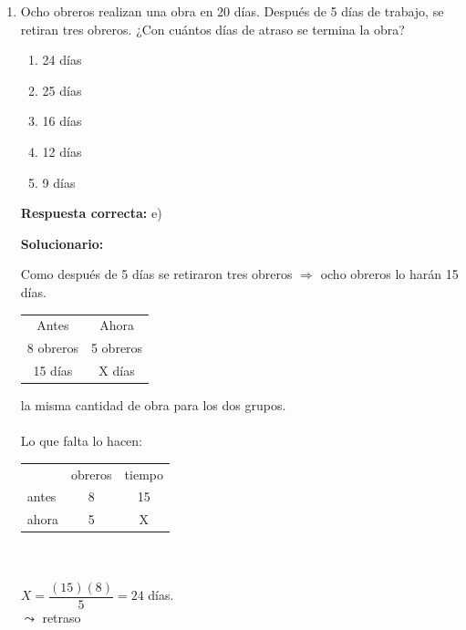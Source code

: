 \begin{enumerate}
	\vspace{2mm}
	\textbf{Solucionario:}
	
	$p$: hace calor. $\quad q$: estudia\\
	$\sim (p \wedge \sim q)$\\
	ley de De Morgan.\\
	$\sim p \vee q \equiv p \rightarrow q$\\
	$\therefore$ Estudio dado que hace calor.
	
	\vspace{6mm}
	
	\item Ocho obreros realizan una obra en 20 días. Después de 5 días de trabajo, se retiran tres obreros. ¿Con cuántos días de atraso se termina la obra?
	\begin{enumerate}[label=\alph*)]
		\item 24 días
		\item 25 días
		\item 16 días
		\item 12 días
		\item 9 días
	\end{enumerate}
	\textbf{Respuesta correcta:} e)
	
	\vspace{2mm}
	\textbf{Solucionario:}
	
	Como después de 5 días se retiraron tres obreros $\Rightarrow $ ocho obreros lo harán 15 días.\\
	
	\begin{tabular}{|c|c|}
		\hline
		Antes & Ahora \\
		8 obreros & 5 obreros \\
		15 días & X días \\
		\hline
	\end{tabular} la misma cantidad de obra para los dos grupos.\\
	\\
	Lo que falta lo hacen:\\
	\begin{tabular}{lcc}
		& obreros & tiempo \\
		antes & 8       & 15 \\
		ahora & 5       & X
	\end{tabular}\\
	\\
	
	$X = \dfrac{(15)(8)}{5} = 24$ días.\\
	$\leadsto$ retraso 
	

\end{enumerate}
